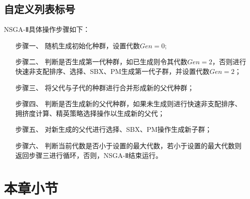 \subsection{自定义列表标号}
\noindent NSGA-Ⅱ具体操作步骤如下：
\begin{enumerate}[leftmargin = 6em, labelsep = 0em]
    \item[步骤一、] 随机生成初始化种群，设置代数$Gen = 0$;
    \item[步骤二、] 判断是否生成第一代种群，如已生成则令其代数$Gen = 2$，否则进行快速非支配排序、选择、SBX、PM生成第一代子群，并设置代数$Gen = 2$；
    \item[步骤三、] 将父代与子代的种群进行合并形成新的父代种群；
    \item[步骤四、] 判断是否生成新的父代种群，如果未生成则进行快速非支配排序、拥挤度计算、精英策略选择操作以生成新的父代；
    \item[步骤五、] 对新生成的父代进行选择、SBX、PM操作生成新子群；
    \item[步骤六、] 判断当前代数是否小于设置的最大代数，若小于设置的最大代数则返回步骤三进行循环，否则，NSGA-Ⅱ结束运行。
\end{enumerate}

\section{本章小节}